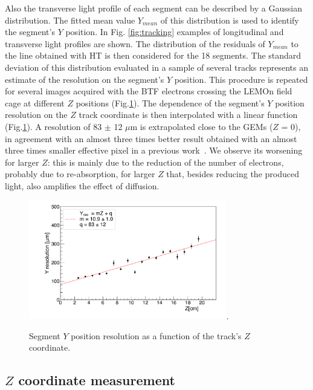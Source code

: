 \documentclass[review]{elsarticle}
\begin{document}
Also the transverse  light profile of each segment can be described by  a Gaussian distribution. The fitted mean value  $Y_{mean}$ of this distribution  is used to identify the segment's $Y$ position. In Fig. \ref{fig:tracking}   examples of longitudinal and transverse light profiles are shown. 
  The distribution of the residuals of $Y_{mean}$ to the line obtained with HT is then considered for the 18 segments. The standard deviation of this distribution evaluated in a sample of several tracks represents an estimate of the resolution on the segment's $Y$ position. This procedure is repeated for several images acquired with the BTF electrons  crossing the LEMOn field cage at different $Z$ positions (Fig.\ref{fig:XYres}).
The  dependence of the segment's $Y$ position resolution  on the $Z$ track coordinate is then interpolated with a linear function (Fig.\ref{fig:XYres}). A resolution  of 83 $\pm$ 12 $\mu$m is extrapolated close to the GEMs ($Z$ = 0), in agreement with an almost three times better result obtained with an almost three times smaller effective pixel in a previous work~\cite{bib:ieee_orange}.
We observe its worsening for larger $Z$: this is mainly due to the reduction of the number of electrons, probably due to re-absorption, for larger $Z$ that, besides reducing the produced light, also amplifies the effect of diffusion.


\begin{figure}[!ht]
\centering
\includegraphics[width=3.4in]{Fig7-Resolution-Z.pdf}\DeclareGraphicsExtensions.
\caption{ Segment $Y$ position resolution  as a function of the track's $Z$ coordinate.}
\label{fig:XYres}
\end{figure}



\subsection{$Z$ coordinate measurement}
\end{document}
